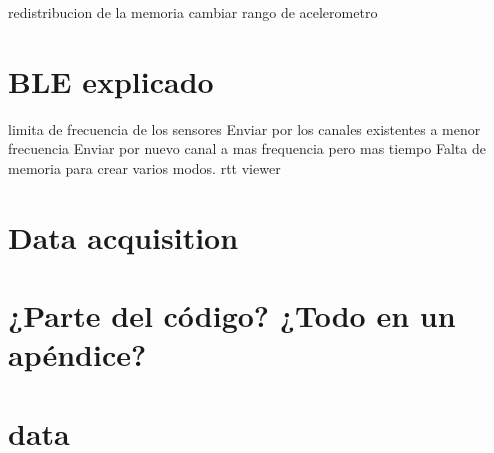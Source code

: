 redistribucion de la memoria
cambiar rango de acelerometro
\section{BLE explicado}\label{sc:ble}
limita de frecuencia de los sensores
Enviar por los canales existentes a menor frecuencia
Enviar por nuevo canal a mas frequencia pero mas tiempo
Falta de memoria para crear varios modos.
rtt viewer

\section{Data acquisition}

\section{¿Parte del código? ¿Todo en un apéndice?}

\section{data}